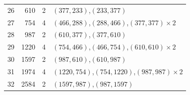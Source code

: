 \begin{table}[H]
\begin{tabular}{r r r l}
26 & 610 & 2 & $(377,233)$,\;$(233,377)$\\
27 & 754 & 4 & $(466,288)$,\;$(288,466)$,\;$(377,377)\times 2$\\
28 & 987 & 2 & $(610,377)$,\;$(377,610)$\\
29 & 1220 & 4 & $(754,466)$,\;$(466,754)$,\;$(610,610)\times 2$\\
30 & 1597 & 2 & $(987,610)$,\;$(610,987)$\\
31 & 1974 & 4 & $(1220,754)$,\;$(754,1220)$,\;$(987,987)\times 2$\\
32 & 2584 & 2 & $(1597,987)$,\;$(987,1597)$\\
\bottomrule
\end{tabular}
\end{table}
